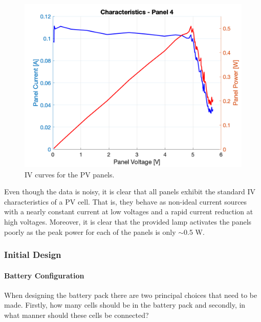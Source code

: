 \documentclass[a4paper]{article}
\begin{document}
\begin{figure}[H]
    \includegraphics[scale=0.18]{Panel4.png}
    \caption{IV curves for the PV panels.}
    \label{fig:IV_curve}
\end{figure}

Even though the data is noisy, it is clear that all panels exhibit the 
standard IV characteristics of a PV cell. That is, they behave as 
non-ideal current sources with a nearly constant current at low 
voltages and a rapid current reduction at high voltages\cite{green}. 
Moreover, it is clear that the provided lamp activates the panels poorly 
as the peak power for each of the panels is only $\sim$0.5 W.

\subsubsection{Initial Design}

\paragraph*{Battery Configuration}
\vspace{-6pt}
When designing the battery pack there are two principal choices that need to be 
made. Firstly, how many cells should be in the battery pack and secondly, in 
what manner should these cells be connected? 
\end{document}
